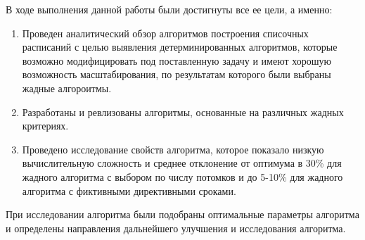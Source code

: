 В ходе выполнения данной работы были достигнуты все ее цели, а именно:
\begin{enumerate}
    \item Проведен аналитический обзор алгоритмов построения списочных расписаний с целью выявления детерминированных алгоритмов, которые возможно модифицировать под поставленную задачу и имеют хорошую возможность масштабирования, по результатам которого были выбраны жадные алгороитмы.
    \item Разработаны и ревлизованы алгоритмы, основанные на различных жадных критериях.
    \item Проведено исследование свойств алгоритма, которое показало низкую вычислительную сложность и среднее отклонение от оптимума в 30\% для жадного алгоритма с выбором по числу потомков и до 5-10\% для жадного алгоритма с фиктивными директивными сроками.
\end{enumerate}

При исследовании алгоритма были подобраны оптимальные параметры алгоритма и определены направления дальнейшего улучшения и исследования алгоритма.